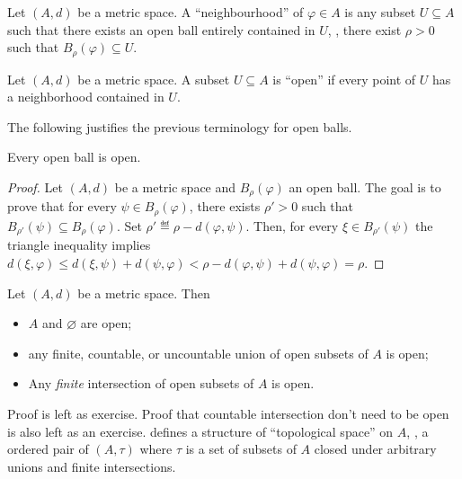 \begin{refsection}
  \begin{definition}[neighbourhood]
    Let $(A,d)$ be a metric space. 
    A ``neighbourhood'' of $\varphi\in A$ is any 
    subset  $U \subseteq A$ such that there exists an open ball entirely contained in $U$, \ie, 
    there exist $\rho > 0 $ such that $B_{\rho}(\varphi) \subseteq U$.
  \end{definition}
  
  \begin{definition} 
    Let $(A,d)$ be a metric space. 
    A subset $U \subseteq A$ is ``open'' if  every point of $U$ has a neighborhood contained in $U$.
  \end{definition}

  The following justifies the previous terminology for open balls. 
  
  \begin{proposition}
     Every open ball is open.
  \end{proposition}
\begin{proof}
  Let $(A,d)$ be a metric space and $B_{\rho}(\varphi)$ an open ball. The goal is to prove that for every $\psi \in B_{\rho}(\varphi)$, there exists $\rho' > 0$ such that $B_{\rho'}(\psi) \subseteq B_{\rho} (\varphi)$. Set $\rho' \eqdef \rho - d(\varphi, \psi)$. Then, for every $\xi \in B_{\rho'}(\psi)$ the triangle inequality implies $d(\xi, \varphi) \leq d(\xi , \psi) + d(\psi, \varphi) < \rho - d(\varphi, \psi) + d(\psi, \varphi) = \rho$. 
\end{proof}

\begin{theorem}
  \label{theorem:topology_metric_space}
    Let $(A,d)$ be a metric space. Then
    \begin{itemize}
      \item $A$ and $\varnothing$ are open;
      \item any finite, countable, or uncountable union of open subsets of $A$  is open;
      \item Any \emph{finite} intersection of open subsets of $A$ is open.
    \end{itemize}
\end{theorem}

Proof is left as exercise. Proof that countable intersection don't need to be open is also left as an exercise.  defines a structure of ``topological space'' on $A$, \ie, a ordered pair of $(A, \tau)$ where $\tau$ is a set of subsets of $A$ closed under arbitrary unions and finite intersections. 



\end{refsection}
